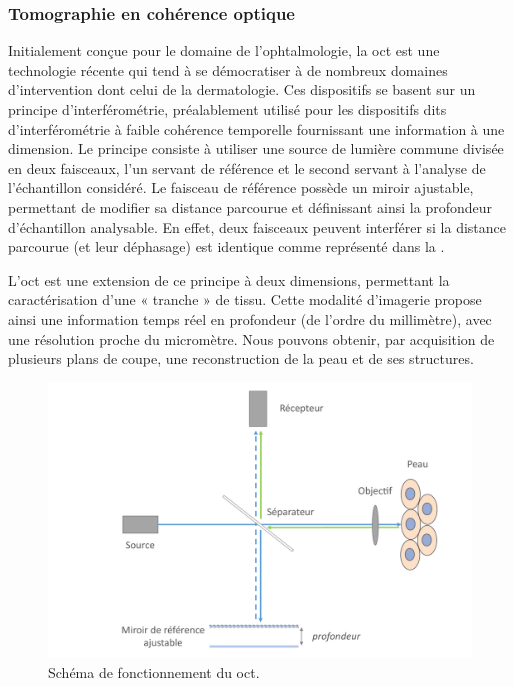 \subsubsection{Tomographie en cohérence optique}
Initialement conçue pour le domaine de l’ophtalmologie, la \gls{oct} est une technologie récente qui tend à se démocratiser à de nombreux domaines d’intervention dont celui de la dermatologie. Ces dispositifs se basent sur un principe d’interférométrie, préalablement utilisé pour les dispositifs dits d’interférométrie à faible cohérence temporelle fournissant une information à une dimension. Le principe consiste à utiliser une source de lumière commune divisée en deux faisceaux, l’un servant de référence et le second servant à l’analyse de l’échantillon considéré. Le faisceau de référence possède un miroir ajustable, permettant de modifier sa distance parcourue et définissant ainsi la profondeur d’échantillon analysable. En effet, deux faisceaux peuvent interférer si la distance parcourue (et leur déphasage) est identique comme représenté dans la .\par

L’\gls{oct} est une extension de ce principe à deux dimensions, permettant la caractérisation d’une « tranche » de tissu. Cette modalité d’imagerie propose ainsi une information temps réel en profondeur (de l’ordre du millimètre), avec une résolution proche du micromètre. Nous pouvons obtenir, par acquisition de plusieurs plans de coupe, une reconstruction de la peau et de ses structures.\par

\begin{figure}[H]
    \centering
    \includegraphics[width=0.8\linewidth]{contents/chapter_2/resources/scheme_principle_oct.pdf}
    \caption{Schéma de fonctionnement du \gls{oct}.}
    \label{fig:scheme_principle_oct}
\end{figure}\par


